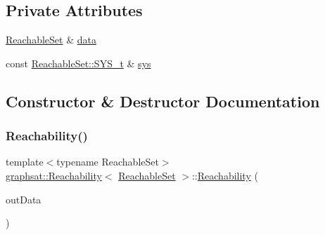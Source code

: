 \subsection*{Private Attributes}
\begin{DoxyCompactItemize}
\item 
\mbox{\hyperlink{classgraphsat_1_1_reachable_set}{Reachable\+Set}} \& \mbox{\hyperlink{classgraphsat_1_1_reachability_a4583b76bbe56a7a2310cacd2721a9c8b}{data}}
\item 
const \mbox{\hyperlink{classgraphsat_1_1_reachable_set_a28cb7ce6be4d0a31c7249085f09432c5}{Reachable\+Set\+::\+S\+Y\+S\+\_\+t}} \& \mbox{\hyperlink{classgraphsat_1_1_reachability_a1613b8cf310ab4d48241a2f65d00f25d}{sys}}
\end{DoxyCompactItemize}


\subsection{Constructor \& Destructor Documentation}
\mbox{\label{classgraphsat_1_1_reachability_a28ada0e8dde0a9d2cb18248a1341b12f}} 
\subsubsection{\texorpdfstring{Reachability()}{Reachability()}}
{\footnotesize\ttfamily template$<$typename Reachable\+Set$>$ \\
\mbox{\hyperlink{classgraphsat_1_1_reachability}{graphsat\+::\+Reachability}}$<$ \mbox{\hyperlink{classgraphsat_1_1_reachable_set}{Reachable\+Set}} $>$\+::\mbox{\hyperlink{classgraphsat_1_1_reachability}{Reachability}} (\begin{DoxyParamCaption}\item[{\mbox{\hyperlink{classgraphsat_1_1_reachable_set}{Reachable\+Set}} \&}]{out\+Data }\end{DoxyParamCaption})\hspace{0.3cm}{\ttfamily [inline]}}

\mbox{\label{classgraphsat_1_1_reachability_acb7e4747d6656ba6e932525a073a8c99}} 
